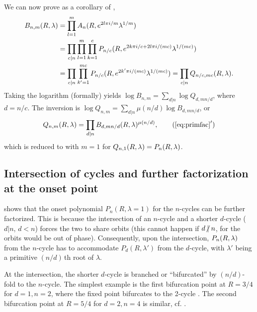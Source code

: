 \documentclass{ws-ijbc}
\begin{document}
We can now prove  as a corollary of ,
\begin{align*}
 B_{n, m} (R, \lambda)
 & = \prod_{l = 1}^{m} A_n(R, e^{2l\pi i/m} \lambda^{1/m}) \\
 & = \prod_{c | n} \prod_{l=1}^m \prod_{k=1}^c P_{n/c}(R, e^{2k\pi i/c + 2l\pi i/(m c)} \lambda^{1/(m c)}) \\
 & = \prod_{c | n} \prod_{k'=1}^{m c} P_{n/c}(R, e^{2k'\pi i/(m c)} \lambda^{1/(m c)})
  = \prod_{c | n} Q_{n /c, m c}(R, \lambda).
\end{align*}
Taking the logarithm (formally) yields
  $\log B_{n, m} = \sum_{d|n} \log Q_{d, m n/d}$,
where $d = n/c$.
The inversion is
  $\log Q_{n, m} = \sum_{d|n} \mu(n/d) \log B_{d, m n/d}$,
or
\begin{equation}
  Q_{n, m}\RX
= \prod_{d|n} B_{d, m n/d}\RX^{\mu(n/d)},
\tag{$\ref{eq:primfac}'$}
\end{equation}
which is reduced to  with $m = 1$
for $Q_{n, 1}(R, \lambda) = P_n(R, \lambda)$.









\subsection{\label{sec:origfac}Intersection of cycles
  and further factorization at the onset point}


 shows that
the onset polynomial
  $P_n(R, \lambda = 1)$ for the $n$-cycles
  can be further factorized.
%
This is because the intersection of an $n$-cycle
  and a shorter $d$-cycle ($d|n$, $d < n$)
  forces the two to share orbits
  (this cannot happen if $d \centernot| n$,
  for the orbits would be out of phase).
%
Consequently, upon the intersection,
  $P_n(R, \lambda)$ from the $n$-cycle
  has to accommodate $P_d(R, \lambda')$ from the $d$-cycle,
  with $\lambda'$ being a primitive $(n/d)\,$th root of $\lambda$.

At the intersection,
  the shorter $d$-cycle is branched or ``bifurcated''
  by $(n/d)$-fold to the $n$-cycle.
%
The simplest example is the first bifurcation point
  at $R = 3/4$ for $d = 1, n = 2$,
  where the fixed point 
  bifurcates to
  the 2-cycle .
The second bifurcation point at $R=5/4$ for $d = 2, n = 4$ is similar,
  cf. .
\end{document}
